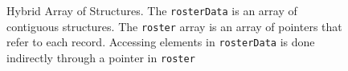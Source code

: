 {\begin{figure}

\caption[Hybrid Array of Structures]{Hybrid Array of Structures.  The \texttt{rosterData} is an array of contiguous structures.  The \texttt{roster} 
array is an array of pointers that refer to each record.  Accessing elements in
\texttt{rosterData} is done indirectly through a pointer in \texttt{roster}}
\label{figure:arrayOfStructuresHybrid}
\end{figure}
}




%

